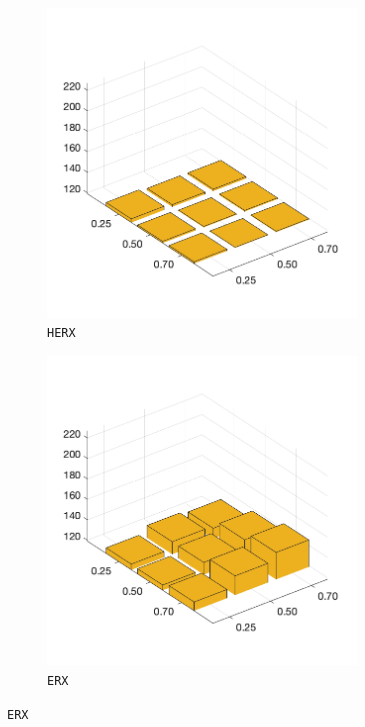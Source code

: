 \begin{figure}[H]
\begin{subfigure}[b]{0.25\textwidth}
		\includegraphics[width=0.9\textwidth]{crossover/min/cross_edge_heuristic_3.png}
		\caption{\texttt{HERX}}
		\label{fig:y}
    	\end{subfigure}
%
	\begin{subfigure}[b]{0.25\textwidth}
		\centering
		\includegraphics[width=0.9\textwidth]{crossover/min/cross_edge_recombination_3.png}
		\caption{\texttt{ERX}}
		\label{fig:z}

\end{subfigure}
\end{figure}
